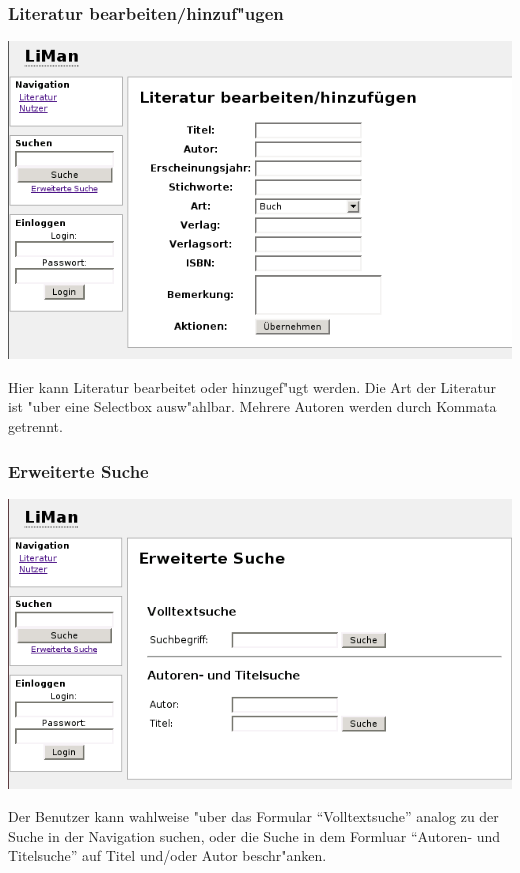 \subsubsection{Literatur bearbeiten/hinzuf"ugen}
\includegraphics[scale=0.6]{litmod.png}

Hier kann Literatur bearbeitet oder hinzugef"ugt werden. Die Art der Literatur ist "uber eine Selectbox ausw"ahlbar.
Mehrere Autoren werden durch Kommata getrennt.
\newpage
\subsubsection{Erweiterte Suche}
\includegraphics[scale=0.6]{searchmore.png}

Der Benutzer kann wahlweise "uber das Formular ``Volltextsuche'' analog zu der Suche in der Navigation suchen, oder die Suche
in dem Formluar ``Autoren- und Titelsuche'' auf Titel und/oder Autor beschr"anken.
